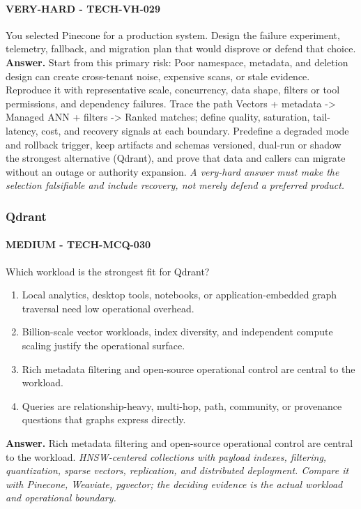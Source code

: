\paragraph{VERY-HARD - TECH-VH-029} You selected Pinecone for a production system. Design the failure experiment, telemetry, fallback, and migration plan that would disprove or defend that choice.
\textbf{Answer.} Start from this primary risk: Poor namespace, metadata, and deletion design can create cross-tenant noise, expensive scans, or stale evidence. Reproduce it with representative scale, concurrency, data shape, filters or tool permissions, and dependency failures. Trace the path Vectors + metadata -> Managed ANN + filters -> Ranked matches; define quality, saturation, tail-latency, cost, and recovery signals at each boundary. Predefine a degraded mode and rollback trigger, keep artifacts and schemas versioned, dual-run or shadow the strongest alternative (Qdrant), and prove that data and callers can migrate without an outage or authority expansion.
\textit{A very-hard answer must make the selection falsifiable and include recovery, not merely defend a preferred product.}
\subsubsection*{Qdrant}
\paragraph{MEDIUM - TECH-MCQ-030} Which workload is the strongest fit for Qdrant?
\begin{enumerate}[label=\Alph*.]
\item Local analytics, desktop tools, notebooks, or application-embedded graph traversal need low operational overhead.
\item Billion-scale vector workloads, index diversity, and independent compute scaling justify the operational surface.
\item Rich metadata filtering and open-source operational control are central to the workload.
\item Queries are relationship-heavy, multi-hop, path, community, or provenance questions that graphs express directly.
\end{enumerate}
\textbf{Answer.} Rich metadata filtering and open-source operational control are central to the workload.
\textit{HNSW-centered collections with payload indexes, filtering, quantization, sparse vectors, replication, and distributed deployment. Compare it with Pinecone, Weaviate, pgvector; the deciding evidence is the actual workload and operational boundary.}
